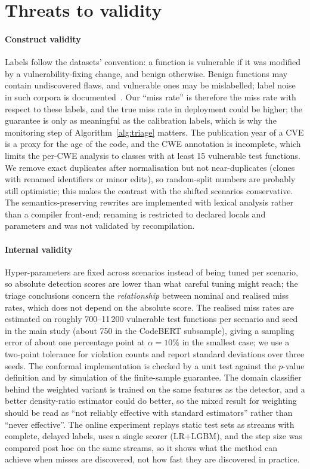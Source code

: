 \section{Threats to validity}\label{sec:threats}

\paragraph{Construct validity}
Labels follow the datasets' convention: a function is vulnerable if it was modified by a vulnerability-fixing change, and benign otherwise. Benign functions may contain undiscovered flaws, and vulnerable ones may be mislabelled; label noise in such corpora is documented~\cite{croft2023data}. Our ``miss rate'' is therefore the miss rate with respect to these labels, and the true miss rate in deployment could be higher; the guarantee is only as meaningful as the calibration labels, which is why the monitoring step of Algorithm~\ref{alg:triage} matters. The publication year of a CVE is a proxy for the age of the code, and the CWE annotation is incomplete, which limits the per-CWE analysis to classes with at least 15 vulnerable test functions.
We remove exact duplicates after normalisation but not near-duplicates (clones with renamed identifiers or minor edits), so random-split numbers are probably still optimistic; this makes the contrast with the shifted scenarios conservative.
The semantics-preserving rewrites are implemented with lexical analysis rather than a compiler front-end; renaming is restricted to declared locals and parameters and was not validated by recompilation.

\paragraph{Internal validity}
Hyper-parameters are fixed across scenarios instead of being tuned per scenario, so absolute detection scores are lower than what careful tuning might reach; the triage conclusions concern the \emph{relationship} between nominal and realised miss rates, which does not depend on the absolute score. The realised miss rates are estimated on roughly 700--11\,200 vulnerable test functions per scenario and seed in the main study (about 750 in the CodeBERT subsample), giving a sampling error of about one percentage point at $\alpha=10\%$ in the smallest case; we use a two-point tolerance for violation counts and report standard deviations over three seeds. The conformal implementation is checked by a unit test against the $p$-value definition and by simulation of the finite-sample guarantee. The domain classifier behind the weighted variant is trained on the same features as the detector, and a better density-ratio estimator could do better, so the mixed result for weighting should be read as ``not reliably effective with standard estimators'' rather than ``never effective''. The online experiment replays static test sets as streams with complete, delayed labels, uses a single scorer (LR+LGBM), and the step size was compared post hoc on the same streams, so it shows what the method can achieve when misses are discovered, not how fast they are discovered in practice.

